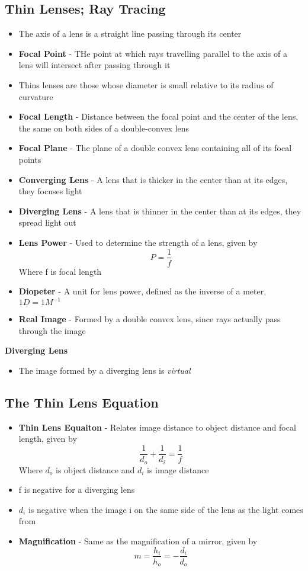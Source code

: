 \subsection{Thin Lenses; Ray Tracing}
\begin{itemize}
    \item The axis of a lens is a straight line passing through its center
    \item \textbf{Focal Point} - THe point at which rays travelling parallel to the axis of a lens will intersect after passing through it
    \item Thins lenses are those whose diameter is small relative to its radius of curvature
    \item \textbf{Focal Length} - Distance between the focal point and the center of the lens, the same on both sides of a double-convex lens
    \item \textbf{Focal Plane} - The plane of a double convex lens containing all of its focal points
    \item \textbf{Converging Lens} - A lens that is thicker in the center than at its edges, they focuses light
    \item \textbf{Diverging Lens} - A lens that is thinner in the center than at its edges, they spread light out
    \item \textbf{Lens Power} - Used to determine the strength of a lens, given by \[P=\frac{1}{f}\] Where f is focal length
    \item \textbf{Diopeter} - A unit for lens power, defined as the inverse of a meter, \(1D=1M^{-1}\)
    \item \textbf{Real Image} - Formed by a double convex lens, since rays actually pass through the image
\end{itemize}

\textbf{Diverging Lens}
\begin{itemize}
    \item The image formed by a diverging lens is \emph{virtual}
\end{itemize}

\subsection{The Thin Lens Equation}
\begin{itemize}
    \item \textbf{Thin Lens Equaiton} - Relates image distance to object distance and focal length, given by \[\frac{1}{d_o}+\frac{1}{d_i}=\frac{1}{f}\] Where \(d_o\) is object distance and \(d_i\) is image distance
    \item f is negative for a diverging lens
    \item \(d_i\) is negative when the image i on the same side of the lens as the light comes from
    \item \textbf{Magnification} - Same as the magnification of a mirror, given by \[m=\frac{h_i}{h_o}=-\frac{d_i}{d_o}\]
\end{itemize}


